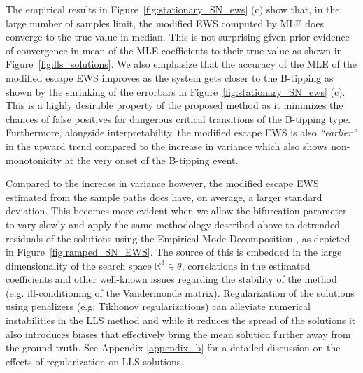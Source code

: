 \documentclass[a4paper,fleqn]{cas-sc}
\newcommand{\fref}[1]{Figure~\ref{#1}}
\begin{document}
The empirical results in \fref{fig:stationary_SN_ews} (c) show that, in the large number of samples limit, the modified EWS computed by MLE does converge to the true value in median.
This is not surprising given prior evidence of convergence in mean of the MLE coefficients to their true value as shown in \fref{fig:lls_solutions}.
We also emphasize that the accuracy of the MLE of the modified escape EWS improves as the system gets closer to the B-tipping as shown by the shrinking of the errorbars in \fref{fig:stationary_SN_ews} (c).
This is a highly desirable property of the proposed method as it minimizes the chances of false positives for dangerous critical transitions of the B-tipping type.
Furthermore, alongside interpretability, the modified escape EWS is also \textit{``earlier''} in the upward trend compared to the increase in variance which also shows non-monotonicity at the very onset of the B-tipping event.

Compared to the increase in variance however, the modified escape EWS estimated from the sample paths does have, on average, a larger standard deviation.
This becomes more evident when we allow the bifurcation parameter to vary slowly and apply the same methodology described above to detrended residuals of the solutions using the Empirical Mode Decomposition \cite{Huang1998}, as depicted in \fref{fig:ramped_SN_EWS}.
The source of this is embedded in the large dimensionality of the search space $\mathbb{R}^{3}\ni\theta$, correlations in the estimated coefficients and other well-known issues regarding the stability of the method (e.g. ill-conditioning of the Vandermonde matrix).
Regularization of the solutions using penalizers (e.g. Tikhonov regularizations) can alleviate numerical instabilities in the LLS method and while it reduces the spread of the solutions it also introduces biases that effectively bring the mean solution further away from the ground truth.
See Appendix \ref{appendix_b} for a detailed discussion on the effects of regularization on LLS solutions.
%
\end{document}
